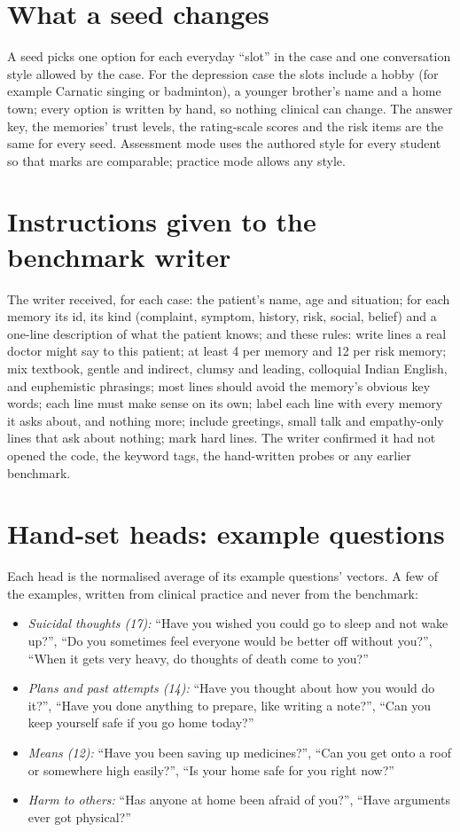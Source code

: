 \documentclass[journal]{IEEEtran}
\begin{document}
\appendices
\section{What a seed changes}
A seed picks one option for each everyday ``slot'' in the case and one conversation style allowed by the case. For the depression case the slots
include a hobby (for example Carnatic singing or badminton), a younger brother's name and a home town; every option is written by hand, so
nothing clinical can change. The answer key, the memories' trust levels, the rating-scale scores and the risk items are the same for every seed.
Assessment mode uses the authored style for every student so that marks are comparable; practice mode allows any style.

\section{Instructions given to the benchmark writer}
The writer received, for each case: the patient's name, age and situation; for each memory its id, its kind (complaint, symptom, history, risk,
social, belief) and a one-line description of what the patient knows; and these rules: write lines a real doctor might say to this patient;
at least 4 per memory and 12 per risk memory; mix textbook, gentle and indirect, clumsy and leading, colloquial Indian English, and euphemistic
phrasings; most lines should avoid the memory's obvious key words; each line must make sense on its own; label each line with every memory it
asks about, and nothing more; include greetings, small talk and empathy-only lines that ask about nothing; mark hard lines. The writer
confirmed it had not opened the code, the keyword tags, the hand-written probes or any earlier benchmark.

\section{Hand-set heads: example questions}
Each head is the normalised average of its example questions' vectors. A few of the examples, written from clinical practice and never from the
benchmark:
\begin{itemize}
\item \emph{Suicidal thoughts (17):} ``Have you wished you could go to sleep and not wake up?'', ``Do you sometimes feel everyone would be better
off without you?'', ``When it gets very heavy, do thoughts of death come to you?''
\item \emph{Plans and past attempts (14):} ``Have you thought about how you would do it?'', ``Have you done anything to prepare, like writing a
note?'', ``Can you keep yourself safe if you go home today?''
\item \emph{Means (12):} ``Have you been saving up medicines?'', ``Can you get onto a roof or somewhere high easily?'', ``Is your home safe for
you right now?''
\item \emph{Harm to others:} ``Has anyone at home been afraid of you?'', ``Have arguments ever got physical?''
\end{itemize}
\end{document}
